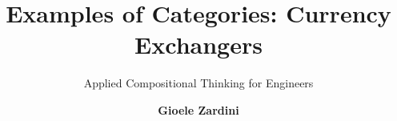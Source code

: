 \title{Examples of Categories: Currency Exchangers}

\subtitle{Applied Compositional Thinking for Engineers}

\date{}

\author[Applied Compositional Thinking for Engineers]
{
    \textbf{Gioele Zardini}
}


\institute[ETHZ]
{
        \begin{center}
        \end{center}
}


